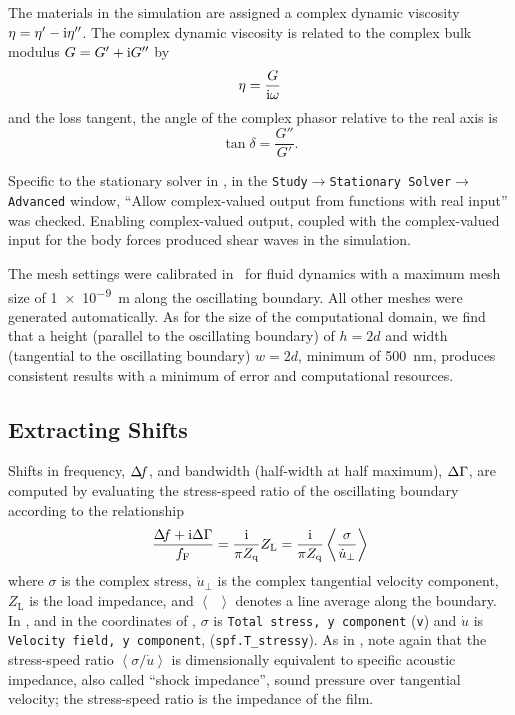 The materials in the simulation are assigned a complex dynamic viscosity
$\eta = \eta'-{\mathrm{i}}\eta''$.  The complex dynamic viscosity is related to the complex bulk modulus
$G=G'+{\mathrm{i}} G''$ by
\begin{align}
 \eta = \frac{G}{{\mathrm{i}} \omega}
\end{align}
and the loss tangent, the angle of the complex phasor relative to the real axis is
\begin{equation}
 \tan \delta = \frac{G''}{G'}.
\end{equation}

Specific to the stationary solver in \comsol, in the
\texttt{Study$\rightarrow$Stationary Solver$\rightarrow$Advanced} window,
``Allow complex-valued output from functions with real input'' was checked.
Enabling complex-valued output, coupled with the complex-valued input for
the body forces produced shear waves in the simulation.

The mesh settings were calibrated in \comsol~for fluid dynamics with a
maximum mesh size of \SI{1e-9}{\meter} along the oscillating boundary.  All
other meshes were generated automatically.  As for the size of the
computational domain, we find that a height (parallel to the oscillating
boundary) of $h=2d$ and width (tangential to the oscillating boundary)
$w=2d$, minimum of \SI{500}{\nano\meter}, produces consistent results with a
minimum of error and computational resources.


\subsection{Extracting Shifts}
Shifts in frequency, $\Delta\!f$, and bandwidth (half-width at half maximum),
$\Delta\Gamma$, are computed by evaluating the stress-speed ratio of the oscillating
boundary according to the relationship
\begin{equation}
 \frac{\Delta\!f+{\mathrm{i}}\Delta\Gamma}{f_{\mathrm{F}}}=\frac{{\mathrm{i}}}{\pi
									Z_{\mathrm{q}}}Z_\mathrm{L} =\frac{{\mathrm{i}}}{\pi
																	Z_{\mathrm{q}}}\left<\frac{\sigma}{\dot{u}_\perp}\right>
\label{eqn:comsolextracttwo}
\end{equation}
where $\sigma$ is the complex stress, $\dot{u}_\perp$ is the complex
tangential velocity component, $Z_\mathrm{L}$ is the load impedance, and $\left<\enspace\right>$
denotes a line average along the boundary.  In \comsol, and in the
coordinates of , $\sigma$ is \texttt{Total stress,
y component} (\texttt{v}) and $\dot{u}$ is \texttt{Velocity field, y
component}, (\texttt{spf.T\_stressy}).  As in ,
note again that the stress-speed ratio $\left<\sigma/\dot{u}\right>$
is dimensionally equivalent to specific acoustic impedance, also called
``shock impedance'', sound pressure over tangential velocity; the
stress-speed ratio is the impedance of the film.

